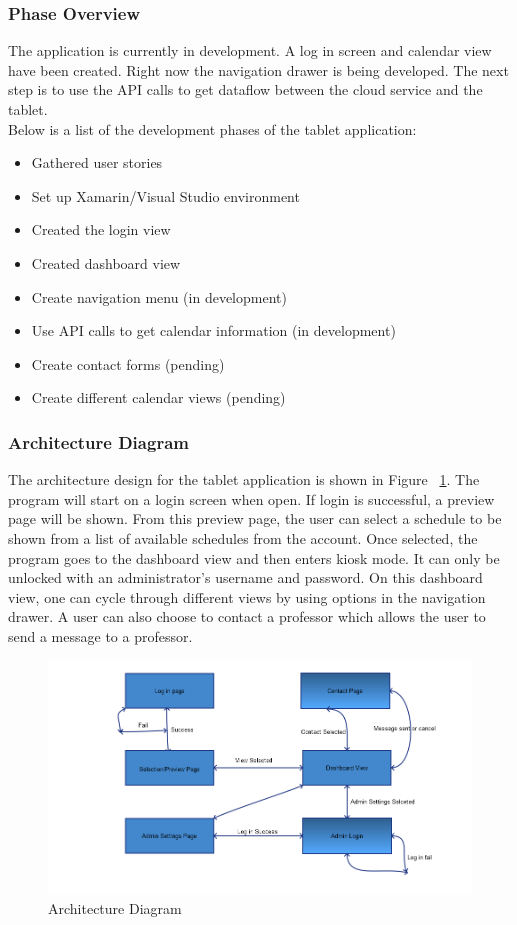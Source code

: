 \documentclass{book}
\begin{document}
\subsubsection{Phase Overview}
The application is currently in development.  A log in screen and calendar view have been created.  Right now the navigation drawer is being developed.  The next step is to use the API calls to get dataflow between the cloud service and the tablet.\\

Below is a list of the development phases of the tablet application:

\begin{itemize}
\item Gathered user stories
\item Set up Xamarin/Visual Studio environment
\item Created the login view
\item Created dashboard view
\item Create navigation menu (in development)
\item Use API calls to get calendar information (in development)
\item Create contact forms (pending)
\item Create different calendar views (pending)
\end{itemize} 


\subsubsection{ Architecture  Diagram}
The architecture design for the tablet application is shown in Figure ~\ref{fig:Architecture}. The program will start on a login screen when open. If login is successful, a preview page will be shown. From this preview page, the user can select a schedule to be shown from a list of available schedules from the account. Once selected, the program goes to the dashboard view and then enters kiosk mode. It can only be unlocked with an administrator's username and password.  On this dashboard view, one can cycle through different views by using options in the navigation drawer.  A user can also choose to contact a professor which allows the user to send a message to a professor.

\begin{figure}[h!]
  \includegraphics[width=\linewidth]{graph.png}
  \caption{Architecture Diagram}
  \label{fig:Architecture}

\end{figure}
\end{document}
